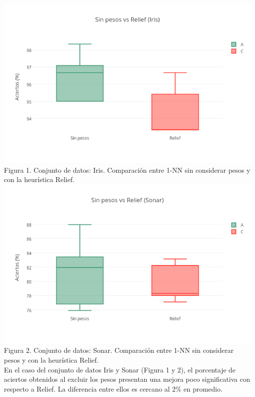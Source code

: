 \documentclass{ci5652}
\begin{document}
\includegraphics[width=\columnwidth]{no_weights-Relief_Iris}
Figura 1. Conjunto de datos: Iris. Comparación entre 1-NN sin considerar pesos y con la heurística Relief.\\

\includegraphics[width=\columnwidth]{no_weights-Relief_Sonar}
Figura 2. Conjunto de datos: Sonar. Comparación entre 1-NN sin considerar pesos y con la heurística Relief.\\

En el caso del conjunto de datos Iris y Sonar (Figura 1 y 2), el porcentaje de aciertos obtenidos al excluir los pesos presentan una mejora poco significativa con respecto a Relief. La diferencia entre ellos es cercano al 2\% en promedio. \\
\end{document}
